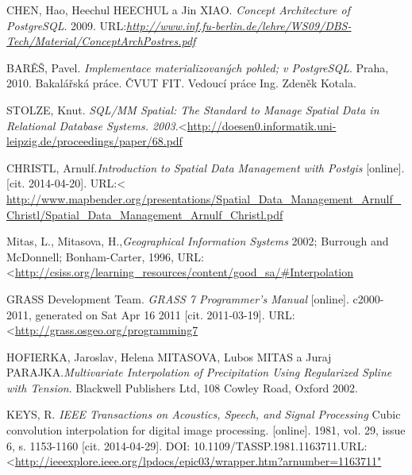 \documentclass[a4paper,12pt,oneside]{report}
\begin{document}
\begin{thebibliography}{99}
CHEN, Hao, Heechul HEECHUL a Jin XIAO. \textit{Concept Architecture of PostgreSQL}. 2009. URL:\textit{\url{http://www.inf.fu-berlin.de/lehre/WS09/DBS-Tech/Material/ConceptArchPostres.pdf}}

BARĚŠ, Pavel. \textit{Implementace materializovaných pohled; v PostgreSQL}. Praha, 2010. Bakalářská práce. ČVUT FIT. Vedoucí práce Ing. Zdeněk Kotala.

STOLZE, Knut. \textit{SQL/MM Spatial: The Standard to Manage Spatial Data in Relational Database Systems. 2003.}\textless\url {http://doesen0.informatik.uni-leipzig.de/proceedings/paper/68.pdf}

CHRISTL, Arnulf.\textit{Introduction to Spatial Data Management with Postgis }
[online]. [cit. 2014-04-20]. URL:\textless\url { http://www.mapbender.org/presentations/Spatial_Data_Management_Arnulf_Christl/Spatial_Data_Management_Arnulf_Christl.pdf}

Mitas, L., Mitasova, H.,\textit{Geographical Information Systems}
2002; Burrough and McDonnell; Bonham-Carter, 1996, URL: \textless\url {http://csiss.org/learning_resources/content/good_sa/#Interpolation}


GRASS Development Team.\textit{ GRASS 7 Programmer’s Manual}
[online]. c2000-2011, generated on Sat Apr 16 2011 [cit. 2011-03-19]. URL:\textless\url {http://grass.osgeo.org/programming7  }

HOFIERKA, Jaroslav, Helena  MITASOVA, Lubos MITAS a Juraj PARAJKA.\textit{Multivariate Interpolation of Precipitation Using Regularized Spline with Tension}. Blackwell Publishers Ltd, 108 Cowley Road, Oxford 2002. 

KEYS, R. \textit{ IEEE Transactions on Acoustics, Speech, and Signal Processing}
Cubic convolution interpolation for digital image processing. [online]. 1981, vol. 29, issue 6, s. 1153-1160 [cit. 2014-04-29]. DOI: 10.1109/TASSP.1981.1163711.URL:\textless\url {http://ieeexplore.ieee.org/lpdocs/epic03/wrapper.htm?arnumber=1163711"}



\end{thebibliography}
\end{document}
